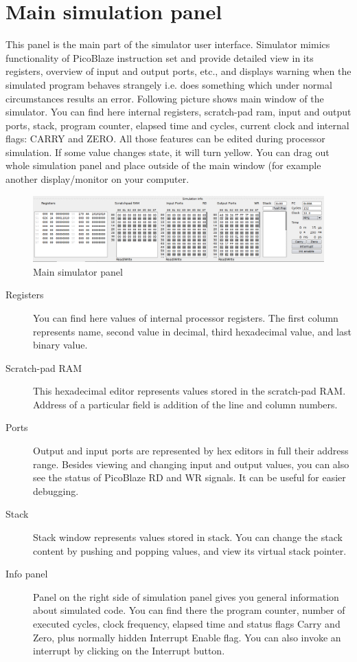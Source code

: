 \section{Main simulation panel}
    This panel is the main part of the simulator user interface. Simulator mimics functionality of PicoBlaze instruction
    set and provide detailed view in its registers, overview of input and output ports, etc., and displays warning when
    the simulated program behaves strangely i.e. does something which under normal circumstances results an error.
    Following picture shows main window of the simulator. You can find here internal registers, scratch-pad ram, input
    and output ports, stack, program counter, elapsed time and cycles, current clock and internal flags: CARRY and ZERO.
    All those features can be edited during processor simulation. If some value changes state, it will turn yellow. You
    can drag out whole simulation panel and place outside of the main window (for example another display/monitor on
    your computer.

   \begin{figure}[h!]
        \centering
        \includegraphics[width=\textwidth]{img/bottom_panel.png}
        \caption{Main simulator panel}
    \end{figure}

    \begin{description}
        \item [Registers]
            You can find here values of internal processor registers. The first column represents name, second value in
            decimal, third hexadecimal value, and last binary value.
        \item [Scratch-pad RAM]
            This hexadecimal editor represents values stored in the scratch-pad RAM. Address of a particular field is
            addition of the line and column numbers.
        \item [Ports]
            Output and input ports are represented by hex editors in full their address range. Besides viewing and
            changing input and output values, you can also see the status of PicoBlaze RD and WR signals. It can be
            useful for easier debugging.
        \item [Stack]
            Stack window represents values stored in stack. You can change the stack content by pushing and popping
            values, and view its virtual stack pointer.
        \item [Info panel]
            Panel on the right side of simulation panel gives you general information about simulated code. You can find
            there the program counter, number of executed cycles, clock frequency, elapsed time and status flags Carry
            and Zero, plus normally hidden Interrupt Enable flag. You can also invoke an interrupt by clicking on the
            Interrupt button.
    \end{description}

